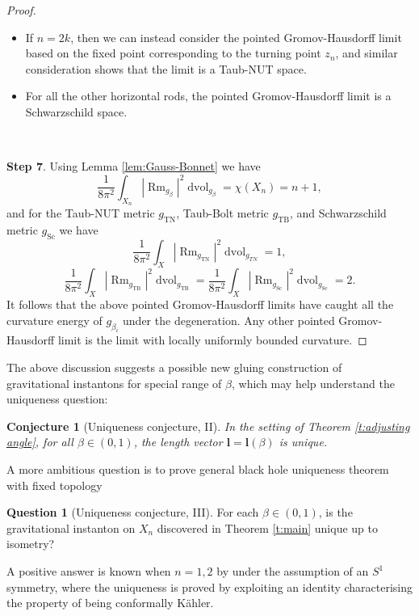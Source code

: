 \documentclass[a4paper,11pt]{amsart}
\newtheorem{conjecture}[theorem]{Conjecture}
\theoremstyle{definition}
\newtheorem{question}[theorem]{Question}
\numberwithin{equation}{section}
\newcommand{\bl}{\bm{l}}
\DeclareMathOperator{\dvol}{dvol}
\DeclareMathOperator{\Rm}{Rm}
\DeclareMathOperator{\AFa}{AF_\beta}
\begin{document}
\begin{proof}
\begin{itemize}
    \item If $n=2k$, then we can instead consider the pointed Gromov-Hausdorff limit based on the fixed point corresponding to the turning point $z_n$, and similar consideration shows that the limit is a  Taub-NUT space.

    
    
    \item For all the other horizontal rods, the pointed Gromov-Hausdorff limit is a Schwarzschild space.
\end{itemize}
   

\

{\bf Step 7}. Using Lemma \ref{lem:Gauss-Bonnet} we have 
$$\frac{1}{8\pi^2}\int_{X_n}|\Rm_{g_\beta}|^2\dvol_{g_\beta}=\chi(X_n)=n+1, $$
and for the Taub-NUT metric $g_{\text{TN}}$, Taub-Bolt metric $g_{\text{TB}}$, and Schwarzschild metric $g_{\text{Sc}}$ we have 
$$\frac{1}{8\pi^2}\int_X|\Rm_{g_{\text{TN}}}|^2\dvol_{g_{TN}}=1,$$
$$\frac{1}{8\pi^2}\int_{X}|\Rm_{g_{\text{TB}}}|^2\dvol_{g_{\text{TB}}}=\frac{1}{8\pi^2}\int_{X}|\Rm_{g_{\text{Sc}}}|^2\dvol_{g_{\text{Sc}}}=2.$$
It follows that the above pointed Gromov-Hausdorff limits have caught all the curvature energy of $g_{\beta_i}$ under the degeneration. Any other pointed Gromov-Hausdorff limit is the limit with locally uniformly bounded curvature.
\end{proof}




The above discussion suggests a possible new gluing construction of $\AFa$ gravitational instantons for special range of $\beta$, which may help understand the uniqueness question:

\begin{conjecture}[Uniqueness conjecture, II]
   In the setting of Theorem \ref{t:adjusting angle}, for all $\beta\in (0, 1)$, the length vector $\bl=\bl(\beta)$ is unique.
\end{conjecture}

A more ambitious question is to prove general black hole uniqueness theorem with fixed topology

\begin{question}[Uniqueness conjecture, III]
    For each $\beta\in (0,1)$, is the $\AFa$ gravitational instanton on $X_n$ discovered in Theorem \ref{t:main} unique up to isometry? 
\end{question}

A positive answer is known when $n=1,2$ by \cite{AADNS} under the assumption of an $S^1$ symmetry, where the uniqueness is proved by exploiting an identity characterising the property of being conformally K\"ahler.
\end{document}
